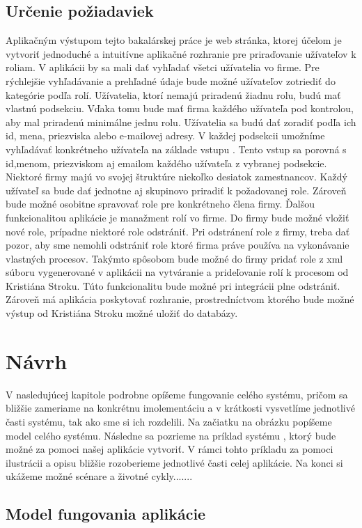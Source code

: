 \subsection{Určenie požiadaviek}
Aplikačným výstupom tejto bakalárskej práce je web stránka, ktorej účelom je vytvoriť jednoduché a intuitívne aplikačné rozhranie pre priraďovanie užívateľov k roliam. V aplikácii by sa mali dať vyhľadať všetci užívatelia vo firme. Pre rýchlejšie vyhľadávanie a prehľadné údaje bude možné užívateľov zotriediť do kategórie podľa rolí. Užívatelia, ktorí nemajú priradenú žiadnu rolu, budú mať vlastnú podsekciu. Vďaka tomu bude mať firma každého užívateľa pod kontrolou, aby mal priradenú minimálne jednu rolu. Užívatelia sa budú dať zoradiť podľa ich id, mena, priezviska alebo e-mailovej adresy. V každej podsekcii umožníme vyhľadávať konkrétneho užívateľa na základe vstupu . Tento vstup sa porovná s id,menom, priezviskom aj emailom každého užívateľa z vybranej podsekcie. Niektoré firmy majú vo svojej štruktúre niekoľko desiatok zamestnancov.   Každý užívateľ sa bude dať jednotne aj skupinovo priradiť k požadovanej role. Zároveň bude možné osobitne spravovať role pre konkrétneho člena firmy. Ďalšou funkcionalitou aplikácie je manažment rolí vo firme. Do firmy bude možné vložiť nové role, prípadne niektoré role odstrániť. Pri odstránení role z firmy, treba dať pozor, aby sme nemohli odstrániť role ktoré firma práve používa na vykonávanie vlastných procesov. Takýmto spôsobom bude možné do firmy pridať role z xml súboru vygenerované v aplikácii na vytváranie a prideľovanie rolí k procesom od Kristiána Stroku. Túto funkcionalitu bude možné pri integrácii plne odstrániť. Zároveň má aplikácia poskytovať rozhranie, prostredníctvom ktorého  bude možné výstup od Kristiána Stroku možné uložiť do databázy. 

\section{Návrh}
V nasledujúcej kapitole podrobne opíšeme fungovanie celého systému, pričom sa bližšie zameriame na konkrétnu imolementáciu a v krátkosti vysvetlíme jednotlivé časti systému, tak ako sme si ich rozdelili. Na začiatku na obrázku popíšeme model celého systému. Následne sa pozrieme na príklad systému , ktorý bude možné za pomoci našej aplikácie vytvoriť. V rámci tohto príkladu za pomoci ilustrácii a opisu bližšie rozoberieme jednotlivé časti celej aplikácie. Na konci si ukážeme možné scénare a životné cykly.......
	
	\subsection{Model fungovania aplikácie}
		
